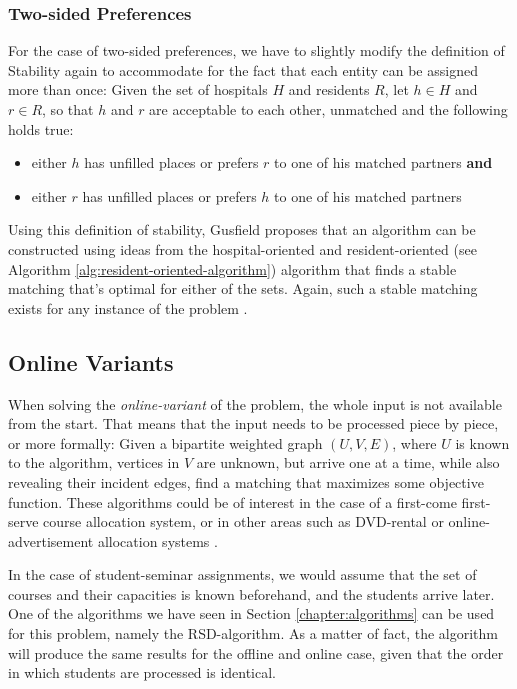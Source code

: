 \subsubsection{Two-sided Preferences}
For the case of two-sided preferences, we have to slightly modify the definition of Stability again to accommodate for the fact that each entity can be assigned more than once: Given the set of hospitals $H$ and residents $R$, let $h \in H$ and $r \in R$, so that $h$ and $r$ are acceptable to each other, unmatched and the following holds true: 
\begin{itemize}
    \item either $h$ has unfilled places or prefers $r$ to one of his matched partners \textbf{and}
    \item either $r$ has unfilled places or prefers $h$ to one of his matched partners
\end{itemize}
Using this definition of stability, Gusfield \cite{Gusfield} proposes that an algorithm can be constructed using ideas from the hospital-oriented and resident-oriented (see Algorithm \ref{alg:resident-oriented-algorithm}) algorithm that finds a stable matching that's optimal for either of the sets. Again, such a stable matching exists for any instance of the problem \cite{Gusfield}.

\subsection{Online Variants}\label{sec:online-variants}
When solving the \emph{online-variant} of the problem, the whole input is not available from the start. That means that the input needs to be processed piece by piece, or more formally: Given a bipartite weighted graph $(U, V, E)$, where $U$ is known to the algorithm, vertices in $V$ are unknown, but arrive one at a time, while also revealing their incident edges, find a matching that maximizes some objective function. These algorithms could be of interest in the case of a first-come first-serve course allocation system, or in other areas such as DVD-rental or online-advertisement allocation systems \cite{Mehta:Online}.

In the case of student-seminar assignments, we would assume that the set of courses and their capacities is known beforehand, and the students arrive later. One of the algorithms we have seen in Section \ref{chapter:algorithms} can be used for this problem, namely the RSD-algorithm. As a matter of fact, the algorithm will produce the same results for the offline and online case, given that the order in which students are processed is identical.

